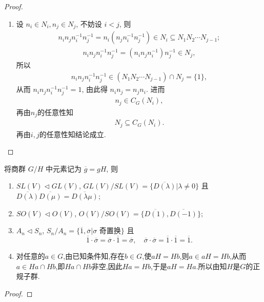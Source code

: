 \documentclass[../../main.tex]{subfiles}%
\begin{document}
\begin{proof}
\begin{enumerate}[(1)]
\item 设 $n_i \in N_i, n_j \in N_j$, 不妨设 $i < j$, 则
\begin{align*}
n_i n_j n_i^{-1} n_j^{-1} = n_i (n_j n_i^{-1} n_j^{-1}) \in N_i \subseteq N_1 N_2 \cdots N_{j-1};
\end{align*}
\begin{align*}
n_i n_j n_i^{-1} n_j^{-1} = (n_i n_j n_i^{-1}) n_j^{-1} \in N_j,
\end{align*}
所以
\begin{align*}
n_i n_j n_i^{-1} n_j^{-1} \in (N_1 N_2 \cdots N_{j-1}) \cap N_j = \{1\},
\end{align*}
从而 $n_i n_j n_i^{-1} n_j^{-1} = 1$, 由此得 $n_i n_j = n_j n_i$.
进而
\begin{align*}
n_j\in C_G(N_i),
\end{align*}
再由$n_j$的任意性知
\begin{align*}
N_j\subseteq C_G(N_i).
\end{align*}
再由$i,j$的任意性知结论成立.
\end{enumerate}
\end{proof}

\begin{example}
将商群 \( G/H \) 中元素记为 \( \overline{g} = gH \), 则
\begin{enumerate}[(1)]
\item \( SL(V) \lhd  GL(V) \), \( GL(V)/SL(V) = \{\overline{D(\lambda)}|\lambda \neq 0\} \) 且 \( \overline{D(\lambda)}\overline{D(\mu)} = \overline{D(\lambda\mu)} \);

\item \( SO(V) \lhd  O(V) \), \( O(V)/SO(V) = \{\overline{D(1)}, \overline{D(-1)}\} \);

\item \( A_n \lhd  S_n \), \( S_n/A_n = \{\overline{1}, \overline{\sigma}|\sigma \text{ 奇置换} \} \) 且
\[
\overline{1} \cdot \overline{\sigma} = \overline{\sigma} \cdot \overline{1} = \overline{\sigma}, \quad \overline{\sigma} \cdot \overline{\sigma} = \overline{1} \cdot \overline{1} = \overline{1}.
\]

\item 对任意的$a\in G$,由已知条件知,存在$b\in G$,使$aH = Hb$,则$a\in aH = Hb$,从而$a\in Ha\cap Hb$,即$Ha\cap Hb$非空,因此$Ha = Hb$,于是$aH = Ha$.所以由知$H$是$G$的正规子群.
\end{enumerate}
\end{example}
\begin{proof}

\end{proof}
\end{document}

